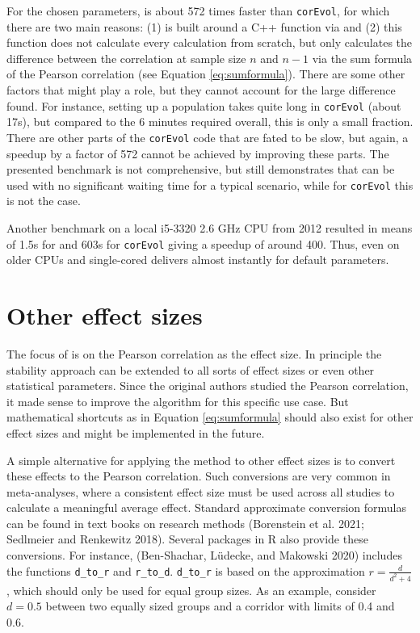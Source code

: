 For the chosen parameters,  is about 572 times faster than \texttt{corEvol}, for which there are two main reasons: (1)  is built around a C++ function via  and (2) this function does not calculate every calculation from scratch, but only calculates the difference between the correlation at sample size \(n\) and \(n-1\) via the sum formula of the Pearson correlation (see Equation \eqref{eq:sumformula}). There are some other factors that might play a role, but they cannot account for the large difference found. For instance, setting up a population takes quite long in \texttt{corEvol} (about 17s), but compared to the 6 minutes required overall, this is only a small fraction. There are other parts of the \texttt{corEvol} code that are fated to be slow, but again, a speedup by a factor of 572 cannot be achieved by improving these parts. The presented benchmark is not comprehensive, but still demonstrates that  can be used with no significant waiting time for a typical scenario, while for \texttt{corEvol} this is not the case.

Another benchmark on a local i5-3320 2.6 GHz CPU from 2012 resulted in means of 1.5s for  and 603s for \texttt{corEvol} giving a speedup of around 400. Thus, even on older CPUs and single-cored  delivers almost instantly for default parameters.

\hypertarget{other-effect-sizes}{%
\section{Other effect sizes}\label{other-effect-sizes}}

The focus of  is on the Pearson correlation as the effect size. In principle the stability approach can be extended to all sorts of effect sizes or even other statistical parameters. Since the original authors studied the Pearson correlation, it made sense to improve the algorithm for this specific use case. But mathematical shortcuts as in Equation \eqref{eq:sumformula} should also exist for other effect sizes and might be implemented in the future.

A simple alternative for applying the method to other effect sizes is to convert these effects to the Pearson correlation. Such conversions are very common in meta-analyses, where a consistent effect size must be used across all studies to calculate a meaningful average effect. Standard approximate conversion formulas can be found in text books on research methods (Borenstein et al. 2021; Sedlmeier and Renkewitz 2018). Several packages in R also provide these conversions. For instance,  (Ben-Shachar, Lüdecke, and Makowski 2020) includes the functions \texttt{d\_to\_r} and \texttt{r\_to\_d}. \texttt{d\_to\_r} is based on the approximation \(r = \frac{d}{d^2+4}\), which should only be used for equal group sizes. As an example, consider \(d=0.5\) between two equally sized groups and a corridor with limits of 0.4 and 0.6.

